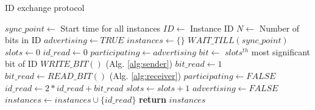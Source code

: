 \begin{algorithm}[!t]
\caption{ID exchange protocol }
\label{alg:protcol}
\begin{algorithmic}[1]
\STATE $sync\_point \leftarrow$ {Start time for all instances}
\STATE $ID \leftarrow$ {Instance ID}
\STATE $N \leftarrow$ {Number of bits in ID}
\STATE $advertising \leftarrow TRUE$
\STATE $instances \leftarrow \{\} $
\STATE $WAIT\_TILL(sync\_point)$
    \STATE $slots \leftarrow 0$
    \STATE $id\_read \leftarrow 0$
    \STATE $participating \leftarrow advertising$
        \STATE $bit \leftarrow$ {$slots^{th}$ most significant bit of ID}
            \STATE $WRITE\_BIT()$               (Alg. \ref{alg:sender})
            \STATE $bit\_read \leftarrow 1$
        \ELSE
            \STATE $bit\_read \leftarrow READ\_BIT()$       (Alg. \ref{alg:receiver})
                \STATE $participating \leftarrow FALSE$
            \ENDIF
        \ENDIF
        \STATE $id\_read \leftarrow 2 * id\_read + bit\_read$
        \STATE $slots \leftarrow slots + 1$
    \ENDWHILE
        \STATE $advertising \leftarrow FALSE$
    \ENDIF
    \STATE $instances \leftarrow instances \cup \{id\_read\}$
\ENDWHILE
\STATE \textbf{return} $instances$
\end{algorithmic}
\end{algorithm}


